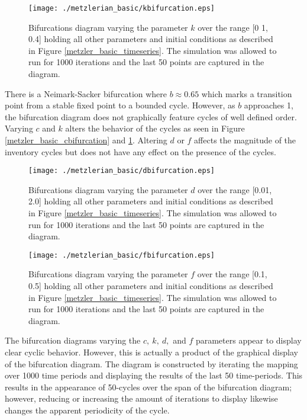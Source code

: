 \begin{figure}
    \centering
    \texttt{[image: ./metzlerian\_basic/kbifurcation.eps]}
    \caption{Bifurcations diagram varying the parameter $k$ over the range [0
    1, 0.4] holding all other parameters and initial conditions as described in Figure \ref{metzler_basic_timeseries}. The simulation was allowed to run for 1000 iterations and the last 50 points are captured in the diagram.}
    \label{metzler_basic_kbifurcation}
\end{figure} 

There is a Neimark-Sacker bifurcation where $b\approx0.65$ which marks a transition point from a stable fixed point to a bounded cycle. However, as $b$ approaches 1, the bifurcation diagram does not graphically feature cycles of well defined order. Varying $c$ and $k$ alters the behavior of the cycles as seen in Figure \ref{metzler_basic_cbifurcation} and \ref{metzler_basic_kbifurcation}. Altering $d$ or $f$ affects the magnitude of the inventory cycles but does not have any effect on the presence of the cycles.

\begin{figure}
    \centering
    \texttt{[image: ./metzlerian\_basic/dbifurcation.eps]}
    \caption{Bifurcations diagram varying the parameter $d$ over the range [0.01, 2.0] holding all other parameters and initial conditions as described in Figure \ref{metzler_basic_timeseries}. The simulation was allowed to run for 1000 iterations and the last 50 points are captured in the diagram.}
    \label{metzler_basic_dbifurcation}
\end{figure} 

\begin{figure}
    \centering
    \texttt{[image: ./metzlerian\_basic/fbifurcation.eps]}
    \caption{Bifurcations diagram varying the parameter $f$ over the range [0.1, 0.5] holding all other parameters and initial conditions as described in Figure \ref{metzler_basic_timeseries}. The simulation was allowed to run for 1000 iterations and the last 50 points are captured in the diagram.}
    \label{metzler_basic_fbifurcation}
\end{figure}

The bifurcation diagrams varying the $c,\ k,\ d,$ and $f$ parameters appear to display clear cyclic behavior. However, this is actually a product of the graphical display of the bifurcation diagram. The diagram is constructed by iterating the mapping over 1000 time periods and displaying the results of the last 50 time-periods. This results in the appearance of 50-cycles over the span of the bifurcation diagram; however, reducing or increasing the amount of iterations to display likewise changes the apparent periodicity of the cycle.

